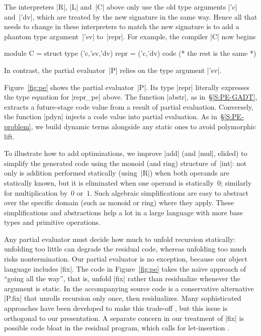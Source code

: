 \documentclass[preprint]{sigplanconf}
\begin{document}
The interpreters |R|, |L| and~|C| above only use the old
type arguments |'c| and~|'dv|, which are treated by the new signature
in the same way.  Hence all that needs to change in these interpreters
to match the new signature is to add a phantom type
argument~|'sv| to~|repr|.
For example, the compiler |C| now begins
\begin{code}
module C = struct
  type ('c,'sv,'dv) repr = ('c,'dv) code
  (* the rest is the same *)
\end{code}
In contrast, the partial evaluator~|P| relies on the type argument |'sv|.

Figure~\ref{fig:pe} shows the partial evaluator~|P|.
Its type |repr| literally expresses the type equation for |repr_pe| above.
The function |abstr|, as in~\S\ref{S:PE-GADT},
extracts a future-stage code value from a result of
partial evaluation.  Conversely, the function |pdyn| injects a
code value into partial evaluation. As
in~\S\ref{S:PE-problem}, we build dynamic terms alongside
any static ones to avoid polymorphic lift.

To illustrate how to add optimizations, we improve |add| (and |mul|,
elided) to simplify the generated code using the monoid (and ring)
structure of~|int|: not only is addition performed statically
(using~|R|) when both operands are statically known, but it is
eliminated when one operand is statically~$0$; similarly for
multiplication by~$0$ or~$1$.  Such algebraic simplifications are easy
to abstract over the specific domain (such as monoid or ring) where they
apply.  These simplifications and abstractions help a lot in a large
language with more base types and primitive operations.

Any partial evaluator must decide how much to unfold recursion
statically: unfolding too little can degrade the residual code, whereas
unfolding too much risks nontermination.  Our partial evaluator is no
exception, because our object language includes |fix|.  The code in
Figure~\ref{fig:pe} takes the na\"\i ve approach of ``going all the
way'', that is, unfold |fix| rather than residualize whenever the
argument is static.  In the accompanying source code is a conservative
alternative |P.fix| that unrolls recursion only once, then residualizes.
Many sophisticated approaches have been developed to make this trade-off
\citep{jones-partial}, but this issue is orthogonal to our presentation.
A separate concern in our treatment of |fix| is possible code bloat in
the residual program, which calls for let-insertion
\citep{SwadiTahaKiselyovPasalic2006}.
\end{document}
